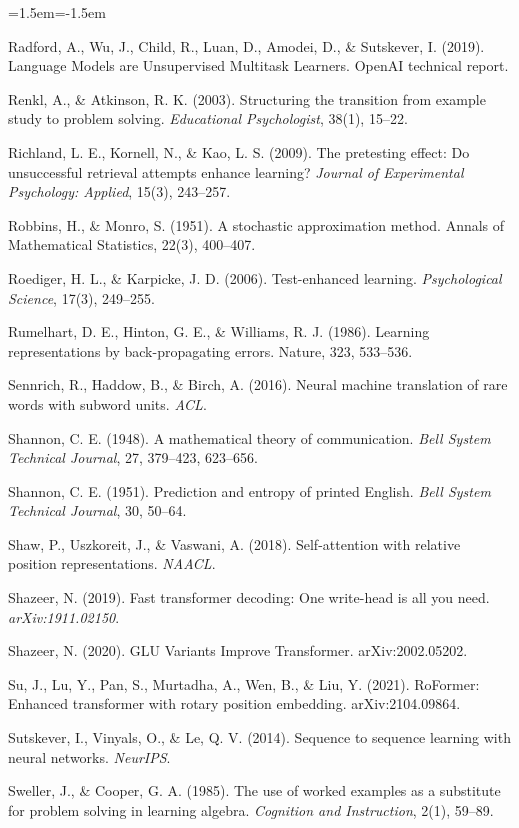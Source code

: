 \begin{list}{}{\leftmargin=1.5em\itemindent=-1.5em\itemsep=2pt\small}
\item Radford, A., Wu, J., Child, R., Luan, D., Amodei, D., \& Sutskever, I. (2019). Language Models are Unsupervised Multitask Learners. OpenAI technical report.
\item Renkl, A., \& Atkinson, R. K. (2003). Structuring the transition from example study to problem solving. \emph{Educational Psychologist}, 38(1), 15--22.
\item Richland, L. E., Kornell, N., \& Kao, L. S. (2009). The pretesting effect: Do unsuccessful retrieval attempts enhance learning? \emph{Journal of Experimental Psychology: Applied}, 15(3), 243--257.
\item Robbins, H., \& Monro, S. (1951). A stochastic approximation method. Annals of Mathematical Statistics, 22(3), 400--407.
\item Roediger, H. L., \& Karpicke, J. D. (2006). Test-enhanced learning. \emph{Psychological Science}, 17(3), 249--255.
\item Rumelhart, D. E., Hinton, G. E., \& Williams, R. J. (1986). Learning representations by back-propagating errors. Nature, 323, 533--536.
\item Sennrich, R., Haddow, B., \& Birch, A. (2016). Neural machine translation of rare words with subword units. \emph{ACL}.
\item Shannon, C. E. (1948). A mathematical theory of communication. \emph{Bell System Technical Journal}, 27, 379--423, 623--656.
\item Shannon, C. E. (1951). Prediction and entropy of printed English. \emph{Bell System Technical Journal}, 30, 50--64.
\item Shaw, P., Uszkoreit, J., \& Vaswani, A. (2018). Self-attention with relative position representations. \emph{NAACL}.
\item Shazeer, N. (2019). Fast transformer decoding: One write-head is all you need. \emph{arXiv:1911.02150}.
\item Shazeer, N. (2020). GLU Variants Improve Transformer. arXiv:2002.05202.
\item Su, J., Lu, Y., Pan, S., Murtadha, A., Wen, B., \& Liu, Y. (2021). RoFormer: Enhanced transformer with rotary position embedding. arXiv:2104.09864.
\item Sutskever, I., Vinyals, O., \& Le, Q. V. (2014). Sequence to sequence learning with neural networks. \emph{NeurIPS}.
\item Sweller, J., \& Cooper, G. A. (1985). The use of worked examples as a substitute for problem solving in learning algebra. \emph{Cognition and Instruction}, 2(1), 59--89.

\end{list}
